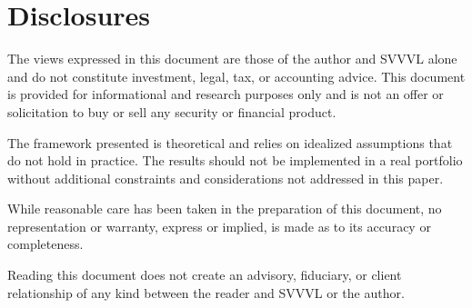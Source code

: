 \documentclass[11pt]{article}
\begin{document}
\newpage
\section{Disclosures}

The views expressed in this document are those of the author and
SVVVL alone and do not constitute investment, legal, tax, or
accounting advice. This document is provided for informational and
research purposes only and is not an offer or solicitation to buy or
sell any security or financial product.

The framework presented is theoretical and relies on idealized
assumptions that do not hold in practice. The results
should not be implemented in a real portfolio without additional
constraints and considerations not addressed in this paper.

While reasonable care has been taken in the preparation of this
document, no representation or warranty, express or implied, is made
as to its accuracy or completeness.

Reading this document does not create an advisory, fiduciary, or
client relationship of any kind between the reader and SVVVL or the
author.
\end{document}
